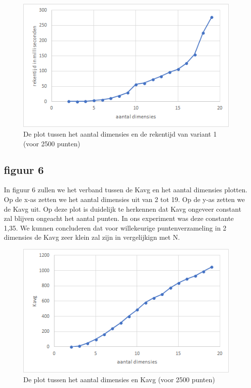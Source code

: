 \documentclass[12pt]{article}
\begin{document}
\begin{figure}
\includegraphics[width=\textwidth]{dim-var1-rekentijd.png}
\caption{De plot tussen het aantal dimensies en de rekentijd van variant 1 (voor 2500 punten)}
\end{figure}

\subsection{figuur 6}

In figuur 6 zullen we het verband tussen de Kavg en het aantal dimensies plotten.
Op de x-as zetten we het aantal dimensies uit van 2 tot 19.
Op de y-as zetten we de Kavg uit.
Op deze plot is duidelijk te herkennen dat Kavg ongeveer constant zal blijven ongeacht het aantal punten.
In ons experiment was deze constante 1,35.
We kunnen concluderen dat voor willekeurige puntenverzameling in 2 dimensies de Kavg zeer klein zal zijn in vergelijkign met N.




\begin{figure}
\includegraphics[width=\textwidth]{dim-Kavg.png}
\caption{De plot tussen het aantal dimensies en Kavg (voor 2500 punten)}
\end{figure}
\end{document}
